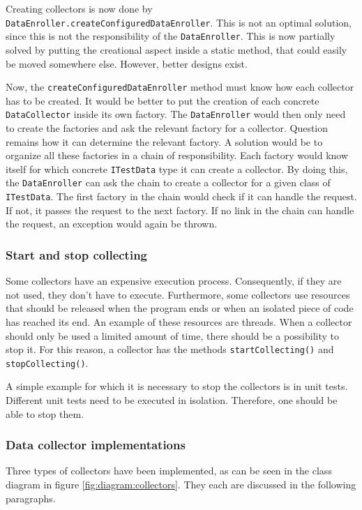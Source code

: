 \documentclass[i2]{oss}
\newcommand{\class}[1]{\texttt{#1}}
\newcommand{\method}[1]{\texttt{#1}}
\begin{document}
Creating collectors is now done by \method{DataEnroller.createConfiguredDataEnroller}.
This is not an optimal solution, since this is not the responsibility of the \class{DataEnroller}.
This is now partially solved by putting the creational aspect inside a static method, that could easily be moved somewhere else.
However, better designs exist.

Now, the \method{createConfiguredDataEnroller} method must know how each collector has to be created.
It would be better to put the creation of each concrete \class{DataCollector} inside its own factory.
The \class{DataEnroller} would then only need to create the factories and ask the relevant factory for a collector.
Question remains how it can determine the relevant factory.
A solution would be to organize all these factories in a chain of responsibility.
Each factory would know itself for which concrete \class{ITestData} type it can create a collector.
By doing this, the \class{DataEnroller} can ask the chain to create a collector for a given class of \class{ITestData}.
The first factory in the chain would check if it can handle the request.
If not, it passes the request to the next factory.
If no link in the chain can handle the request, an exception would again be thrown.

\subsubsection{Start and stop collecting}

Some collectors have an expensive execution process.
Consequently, if they are not used, they don't have to execute.
Furthermore, some collectors use resources that should be released when the program ends or when an isolated piece of code has reached its end.
An example of these resources are threads.
When a collector should only be used a limited amount of time, there should be a possibility to stop it.
For this reason, a collector has the methods \method{startCollecting()} and \method{stopCollecting()}.

A simple example for which it is necessary to stop the collectors is in unit tests.
Different unit tests need to be executed in isolation. 
Therefore, one should be able to stop them.

\subsubsection{Data collector implementations}

Three types of collectors have been implemented, as can be seen in the class diagram in figure \ref{fig:diagram:collectors}.
They each are discussed in the following paragraphs.
\end{document}
